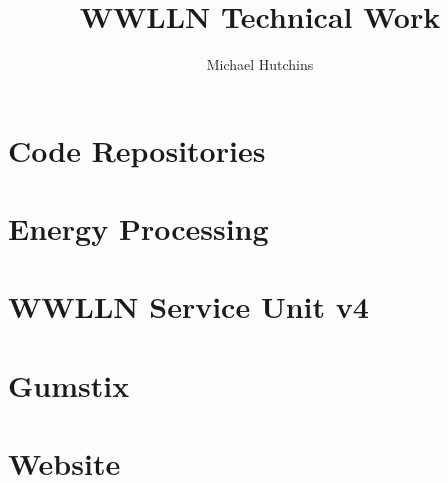 \documentclass[12pt, letterpaper, onecolumn, oneside]{report}
\title{WWLLN Technical Work}
\author{Michael Hutchins}
\begin{document}
\maketitle

%
%

\tableofcontents
\listoffigures
\listoftables  %

%
%


\chapter{Code Repositories}
\label{thesis:appendix:code}




\chapter{Energy Processing}
\label{thesis:appendix:energy}




\chapter{WWLLN Service Unit v4}
\label{thesis:appendix:su}




\chapter{Gumstix}
\label{thesis:appendix:gumstix}




\chapter{Website}
\label{thesis:appendix:website}



%
%



\end{document}
